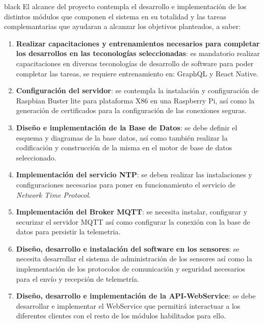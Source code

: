 \documentclass[11pt]{charter}
\begin{document}
\begin{consigna}{black}
%
%
%
El alcance del proyecto contempla el desarrollo e implementación de los distintos módulos que componen el sistema en su totalidad y las tareas complemantarias que ayudaran a alcanzar los objetivos planteados, a saber:

\begin{enumerate}
	\item \textbf{Realizar capacitaciones y entrenamientos necesarios para completar los desarrollos en las teconologías seleccionadas}: es mandatorio realizar capacitaciones en diversas teconologías de desarrollo de software para poder completar las tareas, se requiere entrenamiento en: GraphQL y React Native.
	\item \textbf{Configuración del servidor}: se contempla la instalación y configuración de Raspbian Buster lite para plataforma X86 en una Raspberry Pi, así como la generación de certificados para la configuración de las conexiones seguras.	
	\item \textbf{Diseño e implementación de la Base de Datos}: se debe definir el esquema y diagramas de la base datos, así como también realizar la codificación y construcción de la misma en el motor de base de datos seleccionado.
	\item \textbf{Implementación del servicio NTP}: se deben realizar las instalaciones y configuraciones necesarias para poner en funcionamiento el servicio de \textit{Network Time Protocol}.
	\item \textbf{Implementación del Broker MQTT}: se necesita instalar, configurar y securizar el servidor MQTT así como configurar la conexión con la base de datos para persistir la telemetria.
	\item \textbf{Diseño, desarrollo e instalación del software en los sensores}: se necesita desarrollar el sistema de administración de los sensores así como la implementación de los protocolos de comunicación y seguridad necesarios para el envío y recepción de telemetría.
	\item \textbf{Diseño, desarrollo e implementación de la API-WebService}: se debe desarrollar e implementar el WebService que permitirá interactuar a los diferentes clientes con el resto de los módulos habilitados para ello.

\end{enumerate}
\end{consigna}
\end{document}
